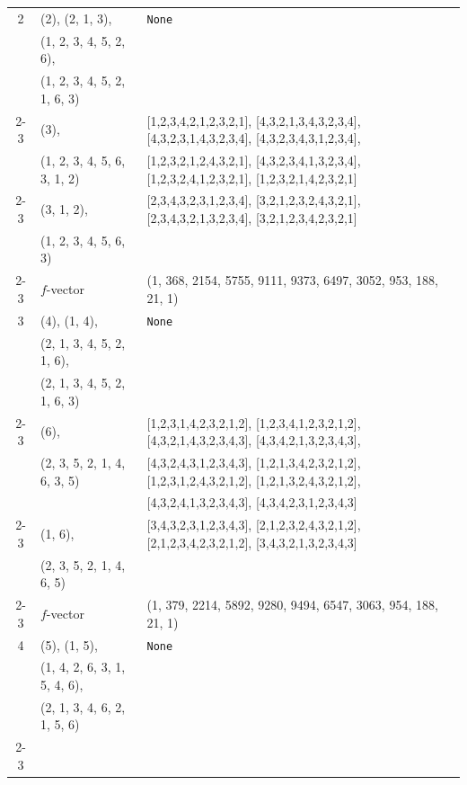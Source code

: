 \documentclass[10pt]{amsart}
\numberwithin{equation}{section}
\theoremstyle{plain}
\theoremstyle{definition}
\theoremstyle{remark}
\begin{document}
{\begin{longtable}{c|l|l}
		2 & (2), (2, 1, 3), & \texttt{None} \\
		& (1, 2, 3, 4, 5, 2, 6), &  \\
		& (1, 2, 3, 4, 5, 2, 1, 6, 3) &  \\ \cline{2-3}
		
		& (3), & [1,2,3,4,2,1,2,3,2,1], [4,3,2,1,3,4,3,2,3,4], [4,3,2,3,1,4,3,2,3,4], [4,3,2,3,4,3,1,2,3,4], \\
		& (1, 2, 3, 4, 5, 6, 3, 1, 2) & [1,2,3,2,1,2,4,3,2,1], [4,3,2,3,4,1,3,2,3,4], [1,2,3,2,4,1,2,3,2,1], [1,2,3,2,1,4,2,3,2,1] \\ \cline{2-3}
		
		& (3, 1, 2), & [2,3,4,3,2,3,1,2,3,4], [3,2,1,2,3,2,4,3,2,1], [2,3,4,3,2,1,3,2,3,4], [3,2,1,2,3,4,2,3,2,1] \\
		& (1, 2, 3, 4, 5, 6, 3) &  \\ \cline{2-3}
		
		& $f$-vector & (1, 368, 2154, 5755, 9111, 9373, 6497, 3052, 953, 188, 21, 1) \\
		\midrule
		
		3 & (4), (1, 4), & \texttt{None} \\
		& (2, 1, 3, 4, 5, 2, 1, 6), &  \\
		& (2, 1, 3, 4, 5, 2, 1, 6, 3) &  \\ \cline{2-3}
		
		& (6), & [1,2,3,1,4,2,3,2,1,2], [1,2,3,4,1,2,3,2,1,2], [4,3,2,1,4,3,2,3,4,3], [4,3,4,2,1,3,2,3,4,3], \\
		& (2, 3, 5, 2, 1, 4, 6, 3, 5) & [4,3,2,4,3,1,2,3,4,3], [1,2,1,3,4,2,3,2,1,2], [1,2,3,1,2,4,3,2,1,2], [1,2,1,3,2,4,3,2,1,2], \\
		&  & [4,3,2,4,1,3,2,3,4,3], [4,3,4,2,3,1,2,3,4,3] \\ \cline{2-3}
		
		& (1, 6), & [3,4,3,2,3,1,2,3,4,3], [2,1,2,3,2,4,3,2,1,2], [2,1,2,3,4,2,3,2,1,2], [3,4,3,2,1,3,2,3,4,3] \\
		& (2, 3, 5, 2, 1, 4, 6, 5) &  \\ \cline{2-3}
		
		& $f$-vector & {(1, 379, 2214, 5892, 9280, 9494, 6547, 3063, 954, 188, 21, 1)} \\
		\midrule
		
		4 & (5), (1, 5), & \texttt{None} \\
		& (1, 4, 2, 6, 3, 1, 5, 4, 6), &  \\
		& (2, 1, 3, 4, 6, 2, 1, 5, 6) &  \\ \cline{2-3}
		

\end{longtable}}
\end{document}
